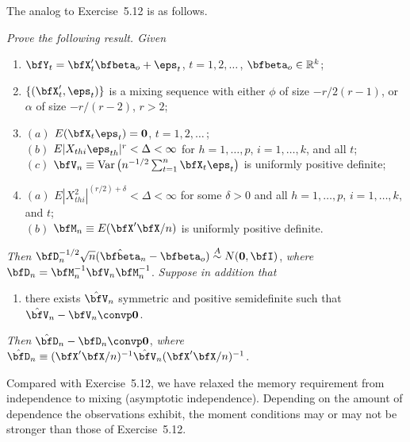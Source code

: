 The analog to Exercise~5.12 is as follows.

\begin{exercises}

\item\label{ex:ols-dhd-clt} \textit{Prove the following result. Given}
\begin{enumerate}
\item[$(i)$] $\bfY_t = \bfX_t'\bfbeta_o + \eps_t$, \quad $t = 1, 2, \ldots$\,, $\bfbeta_o \in \mathbb{R}^k$;
\item[$(ii)$] $\{(\bfX_t', \eps_t)\}$ is a mixing sequence with either $\phi$ of size $-r/2(r-1)$, or $\alpha$ of size $-r/(r-2)$, $r > 2$;
\item[$(iii)$] $(a)$ $E(\bfX_t \eps_t) = \mathbf{0}$, \quad $t = 1, 2, \ldots$\,;\\
$(b)$ $E|X_{thi}\eps_{th}|^r < \Delta < \infty$ for $h = 1, \ldots, p$, $i = 1, \ldots, k$, and all $t$;\\
$(c)$ $\bfV_n \equiv \Var\left(n^{-1/2}\sum_{t=1}^{n}\bfX_t\eps_t\right)$ is uniformly positive definite;
\item[$(iv)$] $(a)$ $E|X_{thi}^2|^{(r/2)+\delta} < \Delta < \infty$ for some $\delta > 0$ and all $h = 1, \ldots, p$, $i = 1, \ldots, k$, and $t$;\\
$(b)$ $\bfM_n \equiv E(\bfX'\bfX/n)$ is uniformly positive definite.
\end{enumerate}

\textit{Then} $\bfD_n^{-1/2}\sqrt{n}(\hat{\bfbeta}_n - \bfbeta_o) \overset{A}{\sim} N(\mathbf{0}, \bfI)$, \textit{where} $\bfD_n = \bfM_n^{-1}\bfV_n\bfM_n^{-1}$. \textit{Suppose in addition that}

\begin{enumerate}
\item[$(v)$] there exists $\hat{\bfV}_n$ symmetric and positive semidefinite such that $\hat{\bfV}_n - \bfV_n \convp \mathbf{0}$.
\end{enumerate}

\textit{Then} $\hat{\bfD}_n - \bfD_n \convp \mathbf{0}$, \textit{where} $\hat{\bfD}_n \equiv (\bfX'\bfX/n)^{-1}\hat{\bfV}_n(\bfX'\bfX/n)^{-1}$.

\end{exercises}

Compared with Exercise~5.12, we have relaxed the memory requirement from independence to mixing (asymptotic independence). Depending on the amount of dependence the observations exhibit, the moment conditions may or may not be stronger than those of Exercise~5.12.

